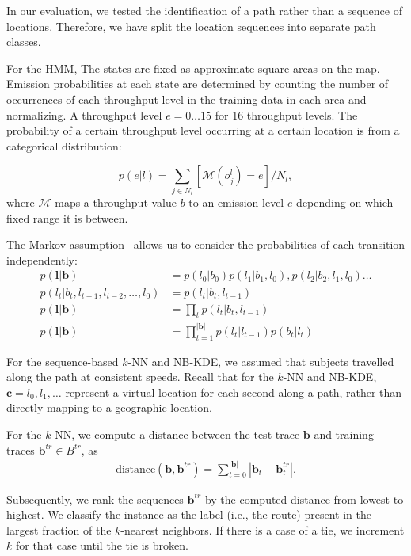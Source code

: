 In our evaluation, we tested the identification of a path rather than
a sequence of locations. Therefore, we have split the location sequences
into separate path classes. 

For the HMM, The states are fixed as approximate square areas on the map. Emission
probabilities at each state are determined by counting the number
of occurrences of each throughput level in the training data in each
area and normalizing. A throughput level $e=0\dots15$ for 16 throughput
levels. The probability of a certain throughput level occurring at
a certain location is from a categorical distribution:

\begin{equation}
p(e|l)=\sum_{j\in N_{l}}[\mathcal{M}(o_{j}^{l})=e]/N_{l},
\end{equation} where $\mathcal{M}$ maps a throughput value $b$ to an emission level $e$ depending on which fixed range it is between.

The Markov assumption~\cite{markov1957theory} allows us to consider the probabilities of each transition independently: 
\begin{align}
p(\mathbf{l}|\mathbf{b})&=p(l_{0}|b_{0})p(l_{1}|b_{1},l_{0}),p(l_{2}|b_{2},l_{1},l_{0})\dots\\
p(l_{t}|b_{t},l_{t-1},l_{t-2},\dots,l_{0})&=p(l_{t}|b_{t},l_{t-1})\\
p(\mathbf{l}|\mathbf{b})&=\prod_{t}p(l_{t}|b_{t},l_{t-1})\\
p(\mathbf{l}|\mathbf{b})&=\prod_{t=1}^{|\mathbf{b}|}p(l_{t}|l_{t-1})p(b_{t}|l_{t})
\end{align}

For the sequence-based $k$-NN and NB-KDE, we assumed that subjects travelled
along the path at consistent speeds. Recall that for the $k$-NN and
NB-KDE, $\mathbf{c}=l_{0},l_{1},\dots$ represent a virtual location
for each second along a path, rather than directly mapping to a geographic
location.

For the $k$-NN, we compute a distance between the test trace $\mathbf{b}$
and training traces $\mathbf{b}^{tr}\in B^{tr}$, as
\begin{align}
\mathrm{distance}(\mathbf{b},\mathbf{b}^{tr})=\sum_{t=0}^{|\mathbf{b|}}|\mathbf{b}_{t}-\mathbf{b}_{t}^{tr}|.
\end{align}

Subsequently, we rank the sequences $\mathbf{b}^{tr}$ by the computed
distance from lowest to highest. We classify the instance as the label (i.e., the route) present in the largest 
fraction of the $k$-nearest neighbors. If there is a case of a tie,
we increment $k$ for that case until the tie is broken.

